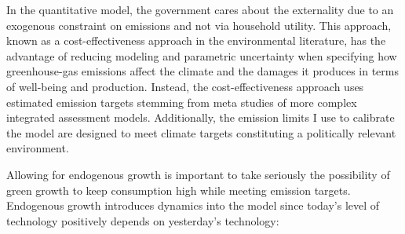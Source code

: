 In the quantitative model, the government cares about the externality due to an exogenous constraint on emissions and not via household utility. This approach, known as a cost-effectiveness approach in the environmental literature, has the advantage of reducing modeling and parametric uncertainty when specifying how greenhouse-gas emissions affect the climate and the damages it produces in terms of well-being and production. Instead, the cost-effectiveness approach uses estimated emission targets stemming from meta studies of more complex integrated assessment models. Additionally, the emission limits I use to calibrate the model are designed to meet climate targets constituting a politically relevant environment. 

Allowing for endogenous growth is important to take seriously the possibility of green growth to keep consumption high while meeting emission targets. Endogenous growth introduces dynamics into the model since today's level of technology positively depends on yesterday's technology:  



